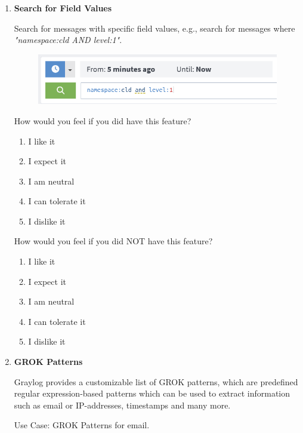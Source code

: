 \documentclass[../main.tex]{subfiles}
\begin{document}
\begin{enumerate}
    \clearpage
    \item \textbf{Search for Field Values}
    
    Search for messages with specific field values, e.g., search for messages where \textit{"namespace:cld AND level:1"}.

    \begin{figure}[H]
        \centering
        \includegraphics[]{img/10-appendix/search.png}
        \label{fig:search}
    \end{figure}

    How would you feel if you did have this feature?
    
    \begin{enumerate}
        \item I like it
        \item I expect it
        \item  I am neutral
        \item I can tolerate it
        \item I dislike it
    \end{enumerate}

    How would you feel if you did NOT have this feature?
    
    \begin{enumerate}
        \item I like it
        \item I expect it
        \item  I am neutral
        \item I can tolerate it
        \item I dislike it
    \end{enumerate}

    \clearpage
    \item \textbf{GROK Patterns}
    
    Graylog provides a customizable list of GROK patterns, which are predefined regular expression-based patterns which can be used to extract information such as email or IP-addresses, timestamps and many more. 
    
    Use Case: GROK Patterns for email.


\end{enumerate}
\end{document}
